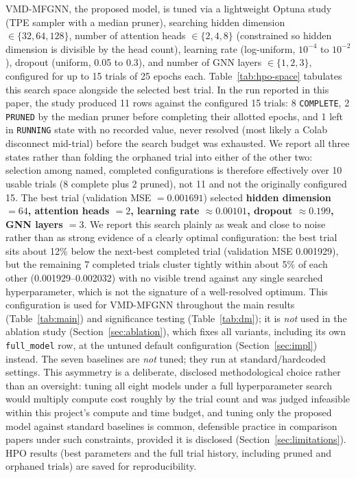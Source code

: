 \documentclass[journal]{IEEEtran}
\begin{document}
VMD-MFGNN, the proposed model, is tuned via a lightweight Optuna study (TPE sampler with a median pruner), searching hidden dimension $\in \{32,64,128\}$, number of attention heads $\in \{2,4,8\}$ (constrained so hidden dimension is divisible by the head count), learning rate (log-uniform, $10^{-4}$ to $10^{-2}$), dropout (uniform, 0.05 to 0.3), and number of GNN layers $\in \{1,2,3\}$, configured for up to 15 trials of 25 epochs each. Table~\ref{tab:hpo-space} tabulates this search space alongside the selected best trial. In the run reported in this paper, the study produced 11 rows against the configured 15 trials: 8 \texttt{COMPLETE}, 2 \texttt{PRUNED} by the median pruner before completing their allotted epochs, and 1 left in \texttt{RUNNING} state with no recorded value, never resolved (most likely a Colab disconnect mid-trial) before the search budget was exhausted. We report all three states rather than folding the orphaned trial into either of the other two: selection among named, completed configurations is therefore effectively over 10 usable trials (8 complete plus 2 pruned), not 11 and not the originally configured 15. The best trial (validation MSE $= 0.001691$) selected \textbf{hidden dimension $=64$, attention heads $=2$, learning rate $\approx 0.00101$, dropout $\approx 0.199$, GNN layers $=3$}. We report this search plainly as weak and close to noise rather than as strong evidence of a clearly optimal configuration: the best trial sits about 12\% below the next-best completed trial (validation MSE 0.001929), but the remaining 7 completed trials cluster tightly within about 5\% of each other (0.001929--0.002032) with no visible trend against any single searched hyperparameter, which is not the signature of a well-resolved optimum. This configuration is used for VMD-MFGNN throughout the main results (Table~\ref{tab:main}) and significance testing (Table~\ref{tab:dm}); it is \emph{not} used in the ablation study (Section~\ref{sec:ablation}), which fixes all variants, including its own \texttt{full\_model} row, at the untuned default configuration (Section~\ref{sec:impl}) instead. The seven baselines are \emph{not} tuned; they run at standard/hardcoded settings. This asymmetry is a deliberate, disclosed methodological choice rather than an oversight: tuning all eight models under a full hyperparameter search would multiply compute cost roughly by the trial count and was judged infeasible within this project's compute and time budget, and tuning only the proposed model against standard baselines is common, defensible practice in comparison papers under such constraints, provided it is disclosed (Section~\ref{sec:limitations}). HPO results (best parameters and the full trial history, including pruned and orphaned trials) are saved for reproducibility.
\end{document}
